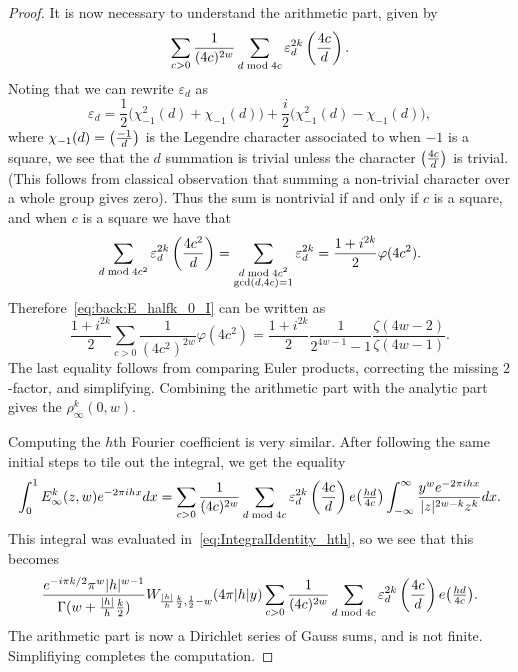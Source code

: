 \begin{proof}
  It is now necessary to understand the arithmetic part, given by
  \begin{equation}\label{eq:back:E_halfk_0_I}
    \sum_{c > 0} \frac{1}{(4c)^{2w}} \sum_{d \bmod 4c} \varepsilon_d^{2k} \left(\frac{4c}{d}\right).
  \end{equation}
  Noting that we can rewrite $\varepsilon_d$ as
  \begin{equation}
    \varepsilon_d = \frac{1}{2}\big( \chi_{-1}^2(d) + \chi_{-1}(d) \big) +
    \frac{i}{2}\big( \chi_{-1}^2(d) - \chi_{-1}(d) \big),
  \end{equation}
  where $\chi_{-1}(d) = \left(\frac{-1}{d}\right)$ is the Legendre character associated to when $-1$ is
  a square, we see that the $d$ summation is trivial unless the character $\left(\frac{4c}{d}\right)$
  is trivial.
  (This follows from classical observation that summing a non-trivial character over a
  whole group gives zero).
  Thus the sum is nontrivial if and only if $c$ is a square, and when $c$ is a square we
  have that
  \begin{equation}
    \sum_{d \bmod 4c^2} \varepsilon_d^{2k}\left(\frac{4c^2}{d}\right)
    = \sum_{\substack{d \bmod 4c^2 \\ \gcd(d,4c) = 1}} \varepsilon_d^{2k}
    = \frac{1 + i^{2k}}{2} \varphi(4c^2).
  \end{equation}
  Therefore~\eqref{eq:back:E_halfk_0_I} can be written as
  \begin{equation}
     \frac{1+i^{2k}}{2} \sum_{c > 0} \frac{1}{(4c^2)^{2w}} \varphi(4c^2)
     = \frac{1+i^{2k}}{2} \frac{1}{2^{4w - 1} - 1} \frac{\zeta(4w - 2)}{\zeta(4w - 1)}.
  \end{equation}
  The last equality follows from comparing Euler products, correcting the missing
  $2$-factor, and simplifying.
  Combining the arithmetic part with the analytic part gives the $\rho_\infty^k(0,w)$.


  Computing the $h$th Fourier coefficient is very similar.
  After following the same initial steps to tile out the integral, we get the equality
  \begin{equation}
    \int_0^1 E_\infty^k(z,w) e^{-2\pi i h x} dx = \sum_{c > 0} \frac{1}{(4c)^{2w}}
    \sum_{d \bmod 4c} \varepsilon_d^{2k} \left(\frac{4c}{d}\right) e\big(\tfrac{hd}{4c}\big)
    \int_{-\infty}^\infty \frac{y^w e^{-2\pi i h x}}{\lvert z \rvert^{2w-k} z^k} dx.
  \end{equation}
  This integral was evaluated in~\eqref{eq:IntegralIdentity_hth}, so we see that this
  becomes
  \begin{equation}
     \frac{e^{-i\pi k/2} \pi^w \lvert h \rvert^{w-1}}
    {\Gamma(w + \frac{\lvert h \rvert}{h}\frac{k}{2})}
    W_{\frac{\lvert h \rvert}{h}\frac{k}{2}, \frac{1}{2} - w} (4 \pi \lvert h \rvert y)
    \sum_{c > 0} \frac{1}{(4c)^{2w}}
    \sum_{d \bmod 4c} \varepsilon_d^{2k} \left(\frac{4c}{d}\right) e\big(\tfrac{hd}{4c}\big).
  \end{equation}
  The arithmetic part is now a Dirichlet series of Gauss sums, and is not finite.
  Simplifiying completes the computation.
\end{proof}






